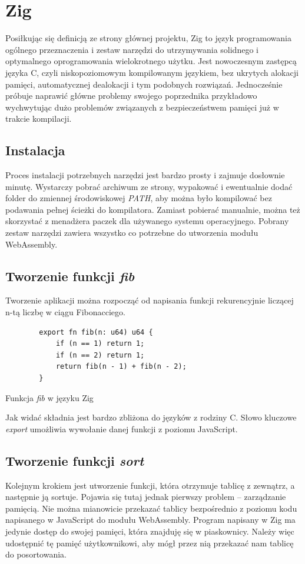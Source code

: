 \documentclass[language=polish,type=master]{aghmodern}
\begin{document}
\section{Zig}
Posiłkując się definicją ze strony głównej projektu\footnotemark{}, Zig to język programowania ogólnego przeznaczenia i zestaw narzędzi do utrzymywania solidnego i optymalnego oprogramowania wielokrotnego użytku.
Jest nowoczesnym zastępcą języka C, czyli niskopoziomowym kompilowanym językiem, bez ukrytych alokacji pamięci, automatycznej dealokacji i tym podobnych rozwiązań.
Jednocześnie próbuje naprawić główne problemy swojego poprzednika przykładowo wychwytując dużo problemów związanych z bezpieczeństwem pamięci już w trakcie kompilacji.

\subsection{Instalacja}
Proces instalacji potrzebnych narzędzi jest bardzo prosty i zajmuje dosłownie minutę.
Wystarczy pobrać archiwum ze strony, wypakować i ewentualnie dodać folder do zmiennej środowiskowej \emph{PATH}, aby można było kompilować bez podawania pełnej ścieżki do kompilatora.
Zamiast pobierać manualnie, można też skorzystać z menadżera paczek dla używanego systemu operacyjnego.
Pobrany zestaw narzędzi zawiera wszystko co potrzebne do utworzenia modułu WebAssembly.

\subsection{Tworzenie funkcji \emph{fib}}
Tworzenie aplikacji można rozpocząć od napisania funkcji rekurencyjnie liczącej n-tą liczbę w ciągu Fibonacciego.

\begin{listing}[H]
    \begin{verbatim}
        export fn fib(n: u64) u64 {
            if (n == 1) return 1;
            if (n == 2) return 1;
            return fib(n - 1) + fib(n - 2);
        }
    \end{verbatim}
    \caption{Funkcja \emph{fib} w języku Zig}
\end{listing}

Jak widać składnia jest bardzo zbliżona do języków z rodziny C.
Słowo kluczowe \emph{export} umożliwia wywołanie danej funkcji z poziomu JavaScript.

\subsection{Tworzenie funkcji \emph{sort}}
Kolejnym krokiem jest utworzenie funkcji, która otrzymuje tablicę z zewnątrz, a następnie ją sortuje.
Pojawia się tutaj jednak pierwszy problem -- zarządzanie pamięcią.
Nie można mianowicie przekazać tablicy bezpośrednio z poziomu kodu napisanego w JavaScript do modułu WebAssembly.
Program napisany w Zig ma jedynie dostęp do swojej pamięci, która znajduję się w piaskownicy.
Należy więc udostępnić tę pamięć użytkownikowi, aby mógł przez nią przekazać nam tablicę do posortowania.
\end{document}
